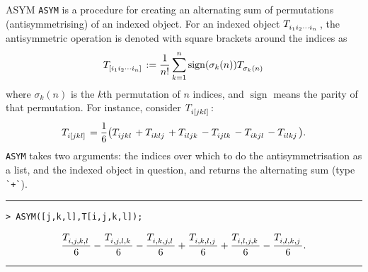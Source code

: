 \documentclass{article}
\DeclareMathOperator{\sign}{sign}
\begin{document}
\begin{macro}{ASYM}
\verb~ASYM~ is a procedure for creating an alternating sum of permutations (antisymmetrising) of an indexed object. For an indexed object $\tensor{T}{_{i_1}_{i_2}_\cdots_{i_n}}$, the antisymmetric operation is denoted with square brackets around the indices as
\[
\tensor{T}{_{[}_{i_1}_{i_2}_{\cdots}_{i_n}_{]}} := \frac{1}{n!} \sum_{k=1}^n \sign(\sigma_k(n)) \tensor{T}{_{\sigma_k(n)}}
\]
where $\sigma_k(n)$ is the $k$th permutation of $n$ indices, and $\sign$ means the parity of that permutation. For instance, consider $\tensor{T}{_i_{[}_j_k_l_{]}}$:
\[
\tensor{T}{_i_{[}_j_k_l_{]}} = \frac{1}{6} \pqty{ \tensor{T}{_i_j_k_l} + \tensor{T}{_i_k_l_j} + \tensor{T}{_i_l_j_k} - \tensor{T}{_i_j_l_k} - \tensor{T}{_i_k_j_l} - \tensor{T}{_i_l_k_j}}.
\]
\verb~ASYM~ takes two arguments: the indices over which to do the antisymmetrisation as a list, and the indexed object in question, and returns the alternating sum (type \verb~`+`~).
\newline\rule{1.0\linewidth}{0.4pt}
\begin{verbatim}
> ASYM([j,k,l],T[i,j,k,l]);
\end{verbatim}
\[
{ \frac{\tensor{T}{_{i,}_{j,}_{k,}_l}}{6} - \frac{\tensor{T}{_{i,}_{j,}_{l,}_k}}{6} - \frac{\tensor{T}{_{i,}_{k,}_{j,}_l}}{6} + \frac{\tensor{T}{_{i,}_{k,}_{l,}_j}}{6} + \frac{\tensor{T}{_{i,}_{l,}_{j,}_k}}{6} - \frac{\tensor{T}{_{i,}_{l,}_{k,}_j}}{6}}.
\]
\newline\rule{1.0\linewidth}{0.4pt}
\end{macro}
\end{document}
